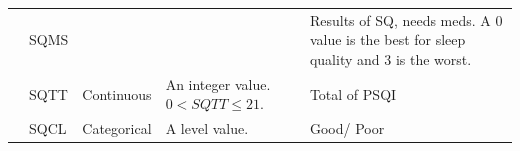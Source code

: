 \documentclass[]{book}
\begin{document}
\begin{table}[ht]
\begin{tabular}{|l|l|l|p{3cm}|p{5cm}|}
        & SQMS                                  &                                    &                                                       & Results of SQ, needs meds. A 0 value is the best for sleep quality and 3 is the worst.                                        \\ \cline{2-5} 
        & SQTT                                  & Continuous                         & An integer value. $ 0 < SQTT\leq 21 $.                 & Total of PSQI                                                                                                                 \\ \cline{2-5} 
        & SQCL                                  & Categorical                        & A level value.                                        & Good/ Poor                                                                                                       \\ \hline
    \end{tabular}
\end{table}
\end{document}
